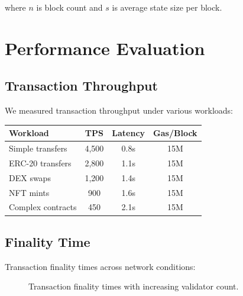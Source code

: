 \documentclass[11pt,letterpaper]{article}
\begin{document}
where $n$ is block count and $s$ is average state size per block.

\section{Performance Evaluation}

\subsection{Transaction Throughput}

We measured transaction throughput under various workloads:

\begin{center}
\begin{tabular}{lccc}
\toprule
\textbf{Workload} & \textbf{TPS} & \textbf{Latency} & \textbf{Gas/Block} \\
\midrule
Simple transfers & 4,500 & 0.8s & 15M \\
ERC-20 transfers & 2,800 & 1.1s & 15M \\
DEX swaps & 1,200 & 1.4s & 15M \\
NFT mints & 900 & 1.6s & 15M \\
Complex contracts & 450 & 2.1s & 15M \\
\bottomrule
\end{tabular}
\end{center}

\subsection{Finality Time}

Transaction finality times across network conditions:

\begin{figure}[h]
\centering
{}
\caption{Transaction finality times with increasing validator count.}
\label{fig:finality}
\end{figure}
\end{document}
